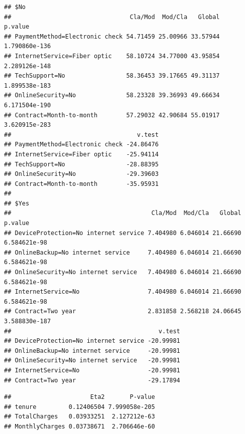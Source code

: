 \documentclass[
  twoside]{article}
\newenvironment{Shaded}{\begin{snugshade}}{\end{snugshade}}
\newcommand{\AttributeTok}[1]{\textcolor[rgb]{0.13,0.29,0.53}{#1}}
\newcommand{\DecValTok}[1]{\textcolor[rgb]{0.00,0.00,0.81}{#1}}
\newcommand{\FunctionTok}[1]{\textcolor[rgb]{0.13,0.29,0.53}{\textbf{#1}}}
\newcommand{\NormalTok}[1]{#1}
\newcommand{\SpecialCharTok}[1]{\textcolor[rgb]{0.81,0.36,0.00}{\textbf{#1}}}
\begin{document}
\begin{Shaded}
\end{Shaded}

\begin{verbatim}
## $No
##                                 Cla/Mod  Mod/Cla   Global       p.value
## PaymentMethod=Electronic check 54.71459 25.00966 33.57944 1.790860e-136
## InternetService=Fiber optic    58.10724 34.77000 43.95854 2.289126e-148
## TechSupport=No                 58.36453 39.17665 49.31137 1.899538e-183
## OnlineSecurity=No              58.23328 39.36993 49.66634 6.171504e-190
## Contract=Month-to-month        57.29032 42.90684 55.01917 3.620915e-283
##                                   v.test
## PaymentMethod=Electronic check -24.86476
## InternetService=Fiber optic    -25.94114
## TechSupport=No                 -28.88395
## OnlineSecurity=No              -29.39603
## Contract=Month-to-month        -35.95931
## 
## $Yes
##                                       Cla/Mod  Mod/Cla   Global       p.value
## DeviceProtection=No internet service 7.404980 6.046014 21.66690  6.584621e-98
## OnlineBackup=No internet service     7.404980 6.046014 21.66690  6.584621e-98
## OnlineSecurity=No internet service   7.404980 6.046014 21.66690  6.584621e-98
## InternetService=No                   7.404980 6.046014 21.66690  6.584621e-98
## Contract=Two year                    2.831858 2.568218 24.06645 3.588830e-187
##                                         v.test
## DeviceProtection=No internet service -20.99981
## OnlineBackup=No internet service     -20.99981
## OnlineSecurity=No internet service   -20.99981
## InternetService=No                   -20.99981
## Contract=Two year                    -29.17894
\end{verbatim}

\begin{Shaded}
\end{Shaded}

\begin{verbatim}
##                      Eta2       P-value
## tenure         0.12406504 7.999058e-205
## TotalCharges   0.03933251  2.127212e-63
## MonthlyCharges 0.03738671  2.706646e-60
\end{verbatim}
\end{document}
